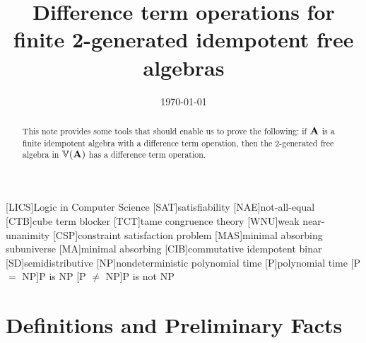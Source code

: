 [LICS]{Logic in Computer Science}
[SAT]{satisfiability}
[NAE]{not-all-equal}
[CTB]{cube term blocker}
[TCT]{tame congruence theory}
[WNU]{weak near-unanimity}
[CSP]{constraint satisfaction problem}
[MAS]{minimal absorbing subuniverse}
[MA]{minimal absorbing}
[CIB]{commutative idempotent binar}
[SD]{semidistributive}
[NP]{nondeterministic polynomial time}
[P]{polynomial time}
[P $ = $ NP]{P is NP}
[P $ \neq $ NP]{P is not NP}





\usepackage{inputs/macros}



\title[Difference Term Operation for $\bF_{\sV}(2)$]
{Difference term operations for finite 2-generated idempotent free algebras}
\date{\today}
\address{University of Hawaii}


\maketitle

\begin{abstract}
This note provides some tools that should enable us to prove
the following: if $\mathbf{A}$ is a finite idempotent algebra with a
difference term operation, then the 2-generated free algebra in $\operatorname{\mathbb{V}}(\mathbf{A})$ has
a difference term operation.  
\end{abstract}

\section{Definitions and Preliminary Facts}
\label{sec:facts}

